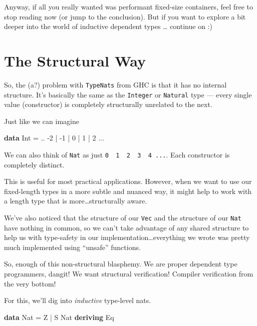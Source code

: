 \documentclass[]{article}
\newenvironment{Shaded}{}{}
\newcommand{\DataTypeTok}[1]{\textcolor[rgb]{0.56,0.13,0.00}{#1}}
\newcommand{\DecValTok}[1]{\textcolor[rgb]{0.25,0.63,0.44}{#1}}
\newcommand{\KeywordTok}[1]{\textcolor[rgb]{0.00,0.44,0.13}{\textbf{#1}}}
\newcommand{\OperatorTok}[1]{\textcolor[rgb]{0.40,0.40,0.40}{#1}}
\newcommand{\OtherTok}[1]{\textcolor[rgb]{0.00,0.44,0.13}{#1}}
\begin{document}
Anyway, if all you really wanted was performant fixed-size containers, feel free
to stop reading now (or jump to the conclusion). But if you want to explore a
bit deeper into the world of inductive dependent types \ldots{} continue on :)

\section{The Structural Way}\label{the-structural-way}

So, the (a?) problem with \texttt{TypeNats} from GHC is that it has no internal
structure. It's basically the same as the \texttt{Integer} or \texttt{Natural}
type --- every single value (constructor) is completely structurally unrelated
to the next.

Just like we can imagine

\begin{Shaded}
\begin{Highlighting}[]
\KeywordTok{data} \DataTypeTok{Int} \OtherTok{=} \OperatorTok{..} \OperatorTok{{-}}\DecValTok{2} \OperatorTok{|} \OperatorTok{{-}}\DecValTok{1} \OperatorTok{|} \DecValTok{0} \OperatorTok{|} \DecValTok{1} \OperatorTok{|} \DecValTok{2} \OperatorTok{...}
\end{Highlighting}
\end{Shaded}

We can also think of \texttt{Nat} as just
\texttt{0\ \textbar{}\ 1\ \textbar{}\ 2\ \textbar{}\ 3\ \textbar{}\ 4\ ...}.
Each constructor is completely distinct.

This is useful for most practical applications. However, when we want to use our
fixed-length types in a more subtle and nuanced way, it might help to work with
a length type that is more\ldots structurally aware.

We've also noticed that the structure of our \texttt{Vec} and the structure of
our \texttt{Nat} have nothing in common, so we can't take advantage of any
shared structure to help us with type-safety in our
implementation\ldots everything we wrote was pretty much implemented using
``unsafe'' functions.

So, enough of this non-structural blasphemy. We are proper dependent type
programmers, dangit! We want structural verification! Compiler verification from
the very bottom!

For this, we'll dig into \emph{inductive} type-level nats.

\begin{Shaded}
\begin{Highlighting}[]
\KeywordTok{data} \DataTypeTok{Nat} \OtherTok{=} \DataTypeTok{Z} \OperatorTok{|} \DataTypeTok{S} \DataTypeTok{Nat}
  \KeywordTok{deriving} \DataTypeTok{Eq}
\end{Highlighting}
\end{Shaded}
\end{document}
